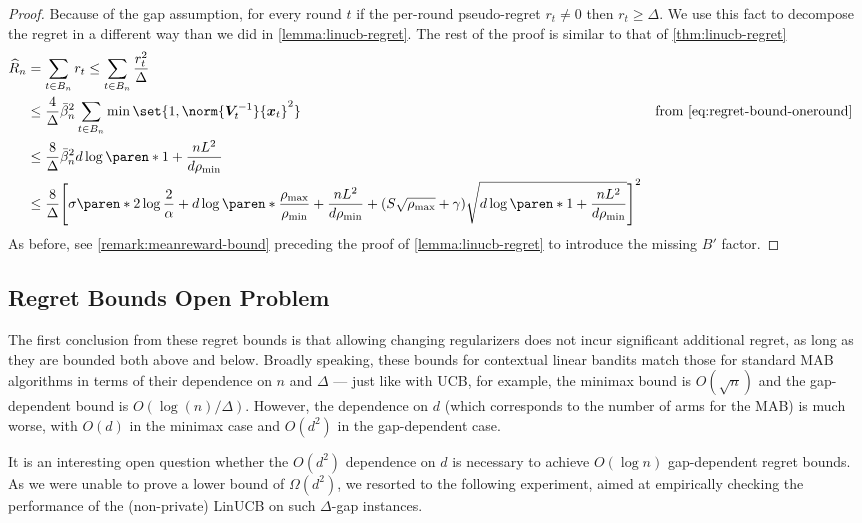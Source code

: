 \documentclass{article}
\renewcommand{\vec}[1]{\bm{#1}}
\newcommand{\inv}[1]{#1^{-1}}
\DeclarePairedDelimiter{\paren}()
\DeclarePairedDelimiter{\brck}{[}{]}
\begin{document}
\begin{proof}
  Because of the gap assumption, for every round $t$ if the per-round
  pseudo-regret $r_t \neq 0$ then $r_t \ge \Delta$.  We use this fact
  to decompose the regret in a different way than we did in
  \cref{lemma:linucb-regret}.  The rest of the proof is similar to
  that of \cref{thm:linucb-regret}
  \begin{align*}
    \widehat R_n
    &= \sum_{t\in B_n} r_t \le \sum_{t\in B_n} \frac{r_t^2}{\Delta} \\
    &\le \frac{4}{\Delta} \bar\beta_n^2 \sum_{t\in B_n} \min\set{1, \norm{\inv{\vec V_t}}{\vec x_t}^2}
    &\text{from~\eqref{eq:regret-bound-oneround}} \\
    &\le \frac{8}{\Delta} \bar\beta_n^2d\log\paren*{1+\frac{nL^2}{d\rho_{\min}}} \\
    &\le \frac{8}{\Delta} \brck*{\sigma\paren*{2\log\frac{2}{\alpha}
      + d\log\paren*{\frac{\rho_{\max}}{\rho_{\min}} + \frac{nL^2}{d\rho_{\min}}}}
      + (S\sqrt{\rho_{\max}}+\gamma)\sqrt{d\log\paren*{1+\frac{nL^2}{d\rho_{\min}}}}}^2
    &&\qedhere
  \end{align*}
  As before, see \cref{remark:meanreward-bound} preceding
  the proof of \cref{lemma:linucb-regret} to introduce
  the missing $B'$ factor.
\end{proof}

\subsection{Regret Bounds Open Problem}
\label{sec:regret-discussion}

The first conclusion from these regret bounds is that allowing
changing regularizers does not incur significant additional regret, as
long as they are bounded both above and below.  Broadly speaking,
these bounds for contextual linear bandits match those for standard
MAB algorithms in terms of their dependence on $n$ and $\Delta$ ---
just like with UCB, for example, the minimax bound is $O(\sqrt n)$ and
the gap-dependent bound is $O(\log(n)/\Delta)$.  However, the
dependence on $d$ (which corresponds to the number of arms for the
MAB) is much worse, with $O(d)$ in the minimax case and $O(d^2)$ in
the gap-dependent case.

It is an interesting open question whether the $O(d^2)$ dependence on
$d$ is necessary to achieve $O(\log n)$ gap-dependent regret bounds.
As we were unable to prove a lower bound of $\Omega(d^2)$, we resorted
to the following experiment, aimed at empirically checking the
performance of the (non-private) LinUCB on such $\Delta$-gap instances.
\end{document}
